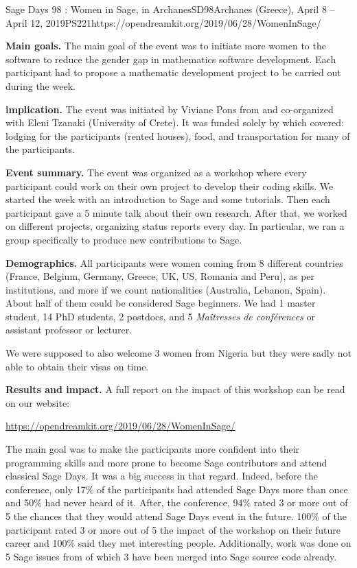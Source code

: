 \begin{event}{Sage Days 98 : Women in Sage, in Archanes}{SD98}{Archanes (Greece), April 8 -- April 12, 2019}{PS}{22}{1}{https://opendreamkit.org/2019/06/28/WomenInSage/}

\textbf{Main goals.} The main goal of the event was to initiate more women to the software \Sage to reduce the gender gap in mathematics software
development. Each participant had to propose a mathematic development project to be carried out during the week.

\textbf{\ODK implication.} The event was initiated by Viviane Pons from \ODK and co-organized with Eleni Tzanaki (University of Crete). It was funded solely by \ODK which covered: lodging for the participants (rented houses), food, and transportation for many of the participants.

\textbf{Event summary.} The event was organized as a workshop where every participant could work on their own project to develop their coding skills. We started the week with an introduction to Sage and some tutorials. Then each participant gave a 5 minute talk about their own research. After that, we worked on different projects, organizing status reports every day. In particular, we ran a group specifically to produce new contributions to Sage.

\textbf{Demographics.} All participants were women coming from 8 different countries (France, Belgium, Germany, Greece, UK, US, Romania and Peru), as per institutions, and more if we count nationalities (Australia, Lebanon, Spain). About half of them could be considered Sage beginners. We had 1 master student, 14 PhD students, 2 postdocs, and 5 \textit{Maîtresses de conférences} or assistant professor or lecturer.

We were supposed to also welcome 3 women from Nigeria but they were sadly not able to obtain their visas on time.

\textbf{Results and impact.} A full report on the impact of this
workshop can be read on our website:
\centerline{\url{https://opendreamkit.org/2019/06/28/WomenInSage/}}
The main goal was to make the participants more confident into their programming skills and more prone to become Sage contributors and attend classical Sage Days. It was a big success in that regard. Indeed, before the conference, only 17\% of the participants had attended Sage Days more than once and 50\% had never heard of it. After, the conference, 94\% rated 3 or more out of 5 the chances that they would attend Sage Days event in the future. 100\% of the participant rated 3 or more out of 5 the impact of the workshop on their future career and 100\% said they met interesting people. Additionally, work was done on 5 Sage issues from of which 3 have been merged into Sage source code already.


\end{event}
